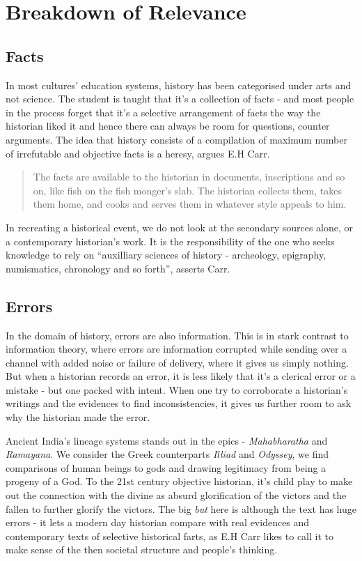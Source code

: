 \documentclass[a4paper]{article}
\begin{document}
\section{Breakdown of Relevance}

\subsection{Facts}

In most cultures' education systems, history has been categorised under
arts and not science. The student is taught that it's a collection of
facts - and most people in the process forget that it's a selective
arrangement of facts the way the historian liked it and hence there can
always be room for questions, counter arguments. The idea that history
consists of a compilation of maximum number of irrefutable and objective
facts is a heresy, argues E.H Carr\cite[p. 15]{carr1961history}.

\blockquote{The facts are available to the historian in documents,
    inscriptions and so on, like fish on the fish monger's slab. The
    historian collects them, takes them home, and cooks and serves them
    in whatever style appeals to him. \cite[p.  9]{carr1961history}}

In recreating a historical event, we do not look at the secondary
sources alone, or a contemporary historian's work. It is the
responsibility of the one who seeks knowledge to rely on ``auxilliary
sciences of history - archeology, epigraphy, numismatics, chronology and
so forth'', asserts Carr\cite[p.11]{carr1961history}.


\subsection{Errors}

In the domain of history, errors are also information. This is in stark
contrast to information theory, where errors are information corrupted
while sending over a channel with added noise or failure of delivery,
where it gives us simply nothing. But when a historian records an error,
it is less likely that it's a clerical error or a mistake - but one
packed with intent. When one try to corroborate a historian's writings
and the evidences to find inconsistencies, it gives us further room to
ask why the historian made the error.

Ancient India's lineage systems stands out in the epics -
\emph{Mahabharatha} and \emph{Ramayana}. We consider the Greek
counterparts \emph{Illiad} and \emph{Odyssey}, we find comparisons of
human beings to gods and drawing legitimacy from being a progeny of a
God. To the 21st century objective historian, it's child play to make
out the connection with the divine as absurd glorification of the
victors and the fallen to further glorify the victors. The big
\emph{but} here is although the text has huge errors - it lets a modern
day historian compare with real evidences and contemporary texts of
selective historical farts, as E.H Carr likes to call it\cite[p.
13]{carr1961history} to make sense of the then societal structure and
people's thinking.
\end{document}
